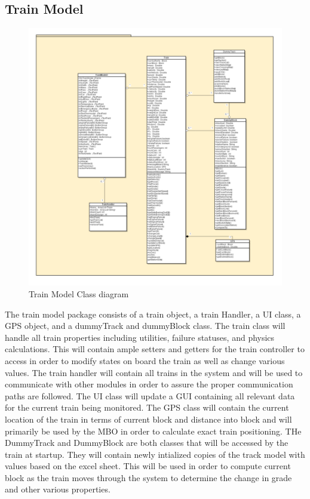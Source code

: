 \documentclass[]{article}
\begin{document}
\subsection{Train Model}
\begin{figure}[H]
	\centering
	\includegraphics[width=\textwidth]{trainmodelclassdiagram.png}
	\caption{Train Model Class diagram}
\end{figure}

The train model package consists of a train object, a train Handler, a UI class, a GPS object, and a dummyTrack and dummyBlock class. The train class will handle all train properties including utilities, failure statuses, and physics calculations. This will contain ample setters and getters for the train controller to access in order to modify states on board the train as well as change various values. The train handler will contain all trains in the system and will be used to communicate with other modules in order to assure the proper communication paths are followed. The UI class will update a GUI containing all relevant data for the current train being monitored. The GPS class will contain the current location of the train in terms of current block and distance into block and will primarily be used by the MBO in order to calculate exact train positioning. THe DummyTrack and DummyBlock are both classes that will be accessed by the train at startup. They will contain newly intialized copies of the track model with values based on the excel sheet. This will be used in order to compute current block as the train moves through the system to determine the change in grade and other various properties.
\end{document}
